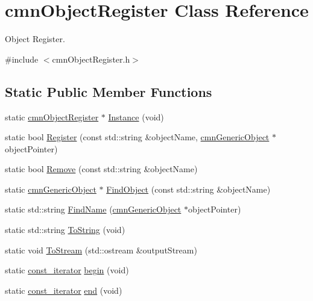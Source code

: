 \hypertarget{classcmn_object_register}{\section{cmn\-Object\-Register Class Reference}
\label{classcmn_object_register}
}


Object Register.  




{\ttfamily \#include $<$cmn\-Object\-Register.\-h$>$}

\subsection*{Static Public Member Functions}
\begin{DoxyCompactItemize}
\item 
static \hyperlink{classcmn_object_register}{cmn\-Object\-Register} $\ast$ \hyperlink{classcmn_object_register_a12ce3c182ea66df7bebf73f784c5770f}{Instance} (void)
\item 
static bool \hyperlink{classcmn_object_register_a21c87771e997e5bca1a77133617abd00}{Register} (const std\-::string \&object\-Name, \hyperlink{classcmn_generic_object}{cmn\-Generic\-Object} $\ast$object\-Pointer)
\item 
static bool \hyperlink{classcmn_object_register_a934f23a8263be0c00f296264cf0f6ac1}{Remove} (const std\-::string \&object\-Name)
\item 
static \hyperlink{classcmn_generic_object}{cmn\-Generic\-Object} $\ast$ \hyperlink{classcmn_object_register_aefc1a04d23806ff8fc6898d766c6931e}{Find\-Object} (const std\-::string \&object\-Name)
\item 
static std\-::string \hyperlink{classcmn_object_register_ab8d39517f6c72d2378e908bca5c387cd}{Find\-Name} (\hyperlink{classcmn_generic_object}{cmn\-Generic\-Object} $\ast$object\-Pointer)
\item 
static std\-::string \hyperlink{classcmn_object_register_a4d0d4cbd1bba936b0ddd3960c9b72ec3}{To\-String} (void)
\item 
static void \hyperlink{classcmn_object_register_a30d8a46ef78f91f1989d5cc6c11bca16}{To\-Stream} (std\-::ostream \&output\-Stream)
\item 
static \hyperlink{classcmn_object_register_a660d73b1be5af069a8f09606a5819d2e}{const\-\_\-iterator} \hyperlink{classcmn_object_register_a4e9e6c7c6c08f697bdd948fdcfc89dd7}{begin} (void)
\item 
static \hyperlink{classcmn_object_register_a660d73b1be5af069a8f09606a5819d2e}{const\-\_\-iterator} \hyperlink{classcmn_object_register_a3bd6326b5cd733036d53ea4532a7d8a1}{end} (void)
\end{DoxyCompactItemize}
